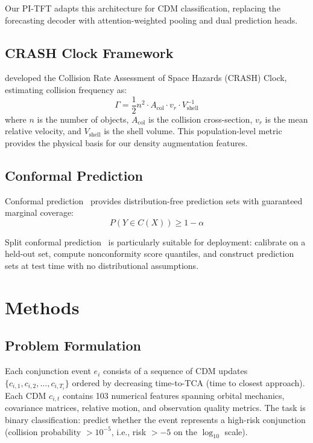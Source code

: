 \documentclass{article}
\begin{document}
Our PI-TFT adapts this architecture for CDM classification, replacing the forecasting decoder with attention-weighted pooling and dual prediction heads.

\subsection{CRASH Clock Framework}
\label{sec:crash}

\citet{thiele2025} developed the Collision Rate Assessment of Space Hazards (CRASH) Clock, estimating collision frequency as:
\begin{equation}
\Gamma = \frac{1}{2} n^2 \cdot A_{\text{col}} \cdot v_r \cdot V_{\text{shell}}^{-1}
\label{eq:crash}
\end{equation}
where $n$ is the number of objects, $A_{\text{col}}$ is the collision cross-section, $v_r$ is the mean relative velocity, and $V_{\text{shell}}$ is the shell volume. This population-level metric provides the physical basis for our density augmentation features.

\subsection{Conformal Prediction}
\label{sec:conformal-related}

Conformal prediction~\citep{vovk2005,angelopoulos2021} provides distribution-free prediction sets with guaranteed marginal coverage:
\begin{equation}
P(Y \in C(X)) \geq 1 - \alpha
\label{eq:conformal}
\end{equation}

Split conformal prediction~\citep{lei2018} is particularly suitable for deployment: calibrate on a held-out set, compute nonconformity score quantiles, and construct prediction sets at test time with no distributional assumptions.

\section{Methods}
\label{sec:methods}

\subsection{Problem Formulation}
\label{sec:problem}

Each conjunction event $e_i$ consists of a sequence of CDM updates $\{c_{i,1}, c_{i,2}, \ldots, c_{i,T_i}\}$ ordered by decreasing time-to-TCA (time to closest approach). Each CDM $c_{i,t}$ contains 103 numerical features spanning orbital mechanics, covariance matrices, relative motion, and observation quality metrics. The task is binary classification: predict whether the event represents a high-risk conjunction (collision probability $> 10^{-5}$, i.e., risk $> -5$ on the $\log_{10}$ scale).
\end{document}
